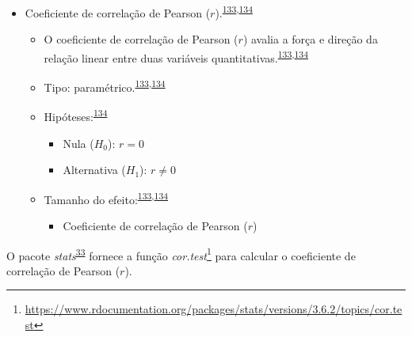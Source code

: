 \documentclass[
  a4paper,
]{book}
\providecommand{\tightlist}{%
  \setlength{\itemsep}{0pt}\setlength{\parskip}{0pt}}
\renewcommand{\href}[2]{#2\footnote{\url{#1}}}
\newenvironment{infobox}[1]
  {
  \begin{itemize}
  \renewcommand{\labelitemi}{
    \raisebox{-.7\height}[0pt][0pt]{
      {\setkeys{Gin}{width=3em,keepaspectratio}
        \texttt{[image: \#1]}}
    }
  }
  \setlength{\fboxsep}{1em}
  \begin{blackbox}
  \item
  }
  {
  \end{blackbox}
  \end{itemize}
  }
\begin{document}
\begin{itemize}
\item
  Coeficiente de correlação de Pearson (\(r\)).\textsuperscript{\protect\hyperlink{ref-khamis2008}{133},\protect\hyperlink{ref-allison2022}{134}}

  \begin{itemize}
  \item
    O coeficiente de correlação de Pearson (\(r\)) avalia a força e direção da relação linear entre duas variáveis quantitativas.\textsuperscript{\protect\hyperlink{ref-khamis2008}{133},\protect\hyperlink{ref-allison2022}{134}}
  \item
    Tipo: paramétrico.\textsuperscript{\protect\hyperlink{ref-khamis2008}{133},\protect\hyperlink{ref-allison2022}{134}}
  \item
    Hipóteses:\textsuperscript{\protect\hyperlink{ref-allison2022}{134}}

    \begin{itemize}
    \item
      Nula (\(H_{0}\)): \(r=0\)
    \item
      Alternativa (\(H_{1}\)): \(r≠0\)
    \end{itemize}
  \item
    Tamanho do efeito:\textsuperscript{\protect\hyperlink{ref-khamis2008}{133},\protect\hyperlink{ref-allison2022}{134}}

    \begin{itemize}
    \tightlist
    \item
      Coeficiente de correlação de Pearson (\(r\))
    \end{itemize}
  \end{itemize}
\end{itemize}

\begin{infobox}{images/Rlogo}
O pacote \emph{stats}\textsuperscript{\protect\hyperlink{ref-stats-2}{33}} fornece a função \href{https://www.rdocumentation.org/packages/stats/versions/3.6.2/topics/cor.test}{\emph{cor.test}} para calcular o coeficiente de correlação de Pearson (\(r\)).

\end{infobox}
\end{document}
